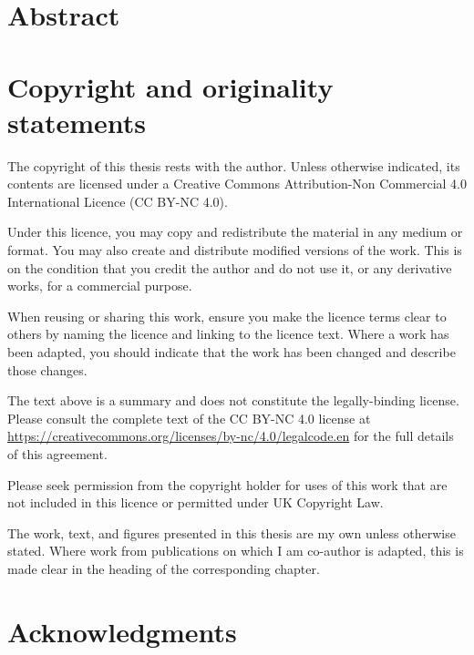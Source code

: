 
\chapter*{Abstract}
\lipsum[1-2]

\chapter*{Copyright and originality statements}
The copyright of this thesis rests with the author.
Unless otherwise indicated, its contents are licensed under a Creative Commons Attribution-Non Commercial 4.0 International Licence (CC BY-NC 4.0).

Under this licence, you may copy and redistribute the material in any medium or format.
You may also create and distribute modified versions of the work.
This is on the condition that you credit the author and do not use it, or any derivative works, for a commercial purpose.

When reusing or sharing this work, ensure you make the licence terms clear to others by naming the licence and linking to the licence text.
Where a work has been adapted, you should indicate that the work has been changed and describe those changes.

The text above is a summary and does not constitute the legally-binding license.
Please consult the complete text of the CC BY-NC 4.0 license at \url{https://creativecommons.org/licenses/by-nc/4.0/legalcode.en} for the full details of this agreement.

Please seek permission from the copyright holder for uses of this work that are not included in this licence or permitted under UK Copyright Law.

The work, text, and figures presented in this thesis are my own unless otherwise stated.
Where work from publications on which I am co-author is adapted, this is made clear in the heading of the corresponding chapter.

\chapter*{Acknowledgments}

